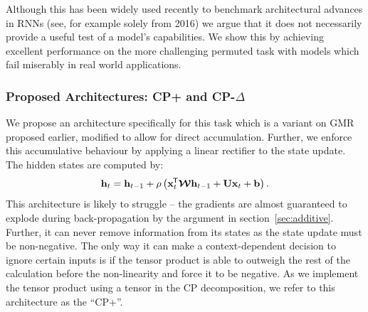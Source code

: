 Although this has been widely used recently to benchmark architectural
advances in RNNs (see, for example 
\autocite{Zhang2016, Barone2016, Gao2016, Neyshabur2016, Cooijmans2016}
solely from 2016) we argue that it does not necessarily provide a useful test of
a model's capabilities. We show this by achieving excellent performance
on the more challenging permuted task with models which fail miserably
in real world applications. 


\subsubsection{Proposed Architectures: CP+ and CP-\(\Delta\)}
We propose an architecture specifically for this task which is a variant on
GMR proposed earlier, modified to allow for direct accumulation.
Further, we enforce this accumulative behaviour by applying a linear rectifier
to the state update. The hidden states are computed by:
\begin{equation}\label{eq:cpplus}
	\mathbf{h}_t = \mathbf{h}_{t-1} + \rho\left( \mathbf{x}^{\mkern-1.5mu\mathsf{T}}_t\bm{\mathcal{W}}\mathbf{h}_{t-1} + \mathbf{U}\mathbf{x}_t + \mathbf{b}\right).
\end{equation} This architecture is likely to struggle -- the gradients are almost
guaranteed to explode during back-propagation by the argument in section~\ref{sec:additive}.
Further, it can never remove information from its states as the state update must be non-negative.
The only way it can make a context-dependent decision to ignore certain inputs is
if the tensor product is able to outweigh the rest of the calculation before the
non-linearity and force it to be negative. As we implement the tensor product
using a tensor in the CP decomposition, we refer to this architecture as the
``CP+''.
%

